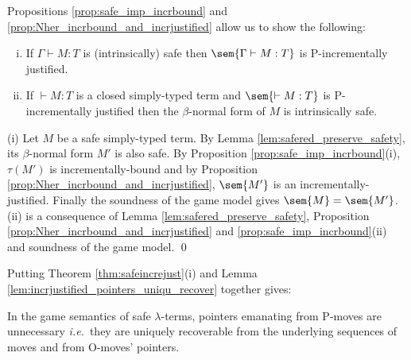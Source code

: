 Propositions \ref{prop:safe_imp_incrbound} and
\ref{prop:Nher_incrbound_and_incrjustified} allow us to show the
following:
\begin{theorem}
\label{thm:safeincrejust} \hfill
\begin{enumerate}[(i)]
\item If $\Gamma \vdash M : T$ is (intrinsically) safe then $\sem{\Gamma \vdash M : T}$ is P-incrementally justified.
\item If $\vdash M : T$ is a closed simply-typed term and $\sem{\vdash M : T}$ is P-incrementally justified then the $\beta$-normal form of $M$ is intrinsically safe.
\end{enumerate}
\end{theorem}
\proof (i) Let $M$ be a safe simply-typed term. By Lemma
\ref{lem:safered_preserve_safety}, its $\beta$-normal form $M'$ is
also safe. By Proposition \ref{prop:safe_imp_incrbound}(i),
$\tau(M')$ is incrementally-bound and by Proposition
\ref{prop:Nher_incrbound_and_incrjustified}, $\sem{M'}$ is an
incrementally-justified. Finally the soundness of the game model
gives $\sem{M} = \sem{M'}$.  (ii) is a consequence of Lemma
\ref{lem:safered_preserve_safety}, Proposition
\ref{prop:Nher_incrbound_and_incrjustified} and
\ref{prop:safe_imp_incrbound}(ii) and soundness of the game model.
\qed



Putting Theorem \ref{thm:safeincrejust}(i) and Lemma
\ref{lem:incrjustified_pointers_uniqu_recover} together gives:
\begin{proposition}
  \label{prop:safe_ptr_recoverable} In the game semantics of safe
  $\lambda$-terms, pointers emanating from P-moves are unnecessary
  {\it i.e.}~they are uniquely recoverable from the underlying sequences of
  moves and from O-moves' pointers.
\end{proposition}


